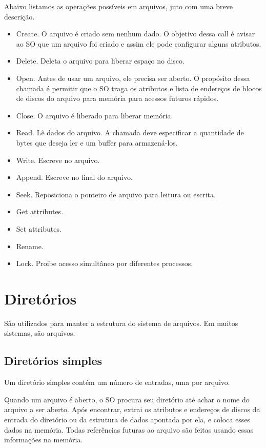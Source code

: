 \documentclass{article}
\begin{document}
Abaixo listamos as operações possíveis em arquivos, juto com uma breve descrição.

\begin{itemize}
  \item Create. O arquivo é criado sem nenhum dado. O objetivo dessa call é avisar ao SO que um arquivo foi criado e assim ele pode configurar alguns atributos.
  \item Delete. Deleta o arquivo para liberar espaço no disco.
  \item Open. Antes de usar um arquivo, ele precisa ser aberto. O propósito dessa chamada é permitir que o SO traga os atributos e lista de endereços de blocos de discos do arquivo para memória para acessos futuros rápidos.
  \item Close. O arquivo é liberado para liberar memória.
  \item Read. Lê dados do arquivo. A chamada deve especificar a quantidade de bytes que deseja ler e um buffer para armazená-los.
  \item Write. Escreve no arquivo.
  \item Append. Escreve no final do arquivo.
  \item Seek. Reposiciona o ponteiro de arquivo para leitura ou escrita. 
  \item Get attributes.
  \item Set attributes.
  \item Rename.
  \item Lock. Proibe acesso simultâneo por diferentes processos.
\end{itemize}

\section{Diretórios}
São utilizados para manter a estrutura do sistema de arquivos. Em muitos sistemas, são arquivos.

\subsection{Diretórios simples}
Um diretório simples contém um número de entradas, uma por arquivo.

Quando um arquivo é aberto, o SO procura seu diretório até achar o nome do arquivo a ser aberto. Após encontrar, extrai os atributos e endereços de discos da entrada do diretório ou da estrutura de dados apontada por ela, e coloca esses dados na memória. Todas referências futuras ao arquivo são feitas usando essas informações na memória.
\end{document}
